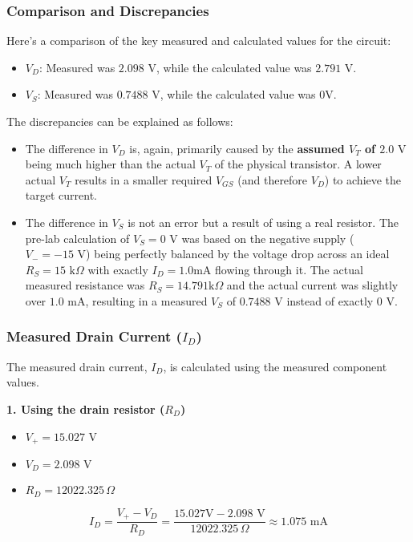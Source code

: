 \documentclass{article}
\begin{document}
\subsubsection*{Comparison and Discrepancies} Here's a comparison of the key
measured and calculated values for the circuit:
\begin{itemize}
  \item
    \textbf{$V_D$}: Measured was \textbf{$2.098 \text{ V}$}, while the calculated
    value was \textbf{$2.791 \text{ V}$}.
  \item \textbf{$V_S$}: Measured was
    \textbf{$0.7488 \text{ V}$}, while the calculated value was \textbf{$0 \text{
    V}$}.
\end{itemize} The discrepancies can be explained as follows:
\begin{itemize}
  \item The difference in \textbf{$V_D$} is, again, primarily
    caused by the \textbf{assumed $V_T$ of $2.0 \text{ V}$} being much higher than
    the actual $V_T$ of the physical transistor. A lower actual $V_T$ results in a
    smaller required $V_{GS}$ (and therefore $V_D$) to achieve the target current.
  \item The difference in \textbf{$V_S$} is not an error but a result of using a
    real resistor. The pre-lab calculation of $V_S=0 \text{ V}$ was based on the
    negative supply ($V_- = -15 \text{ V}$) being perfectly balanced by the voltage
    drop across an ideal $R_S = 15 \text{ k}\Omega$ with exactly $I_D=1.0 \text{
    mA}$ flowing through it. The actual measured resistance was $R_S = 14.791 \text{
    k}\Omega$ and the actual current was slightly over $1.0 \text{ mA}$, resulting
    in a measured $V_S$ of $0.7488 \text{ V}$ instead of exactly $0 \text{ V}$.
\end{itemize}

\subsubsection*{Measured Drain Current ($I_D$)} The measured drain current, $I_D$,
is calculated using the measured component values.

\textbf{1. Using the drain resistor ($R_D$)}
\begin{itemize}
  \item
    $V_{+} = 15.027 \text{ V}$
  \item $V_D = 2.098 \text{ V}$
  \item $R_D = 12022.325
    \, \Omega$
\end{itemize} $$ I_D = \frac{V_{+} - V_D}{R_D} = \frac{15.027 \text{
V} - 2.098 \text{ V}}{12022.325 \, \Omega} \approx 1.075 \text{ mA} $$
\end{document}
